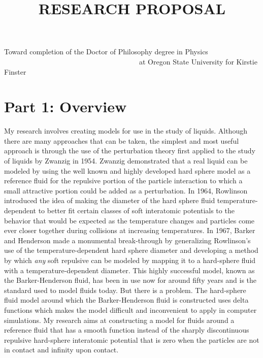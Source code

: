 \documentclass[double,12pt]{revtex4-2}
\begin{document}

\title{RESEARCH PROPOSAL}
\maketitle
\large
\begin{center}Toward completion of the Doctor of Philosophy degree in Physics 
~~~~~~~~~~~~~~~~~~~~~~~~~~~~~~~~~~~~~~at Oregon State University for Kirstie Finster
\end{center}

\normalsize

\section{Part 1: Overview}
My research involves creating models for use in the study of liquids. 
Although there are many approaches that can be taken, the simplest and 
most useful approach is through the use of the perturbation theory first
applied to the study of liquids by Zwanzig in 1954. 
Zwanzig demonstrated that a real liquid can be modeled by using the well 
known and highly developed hard sphere model as a reference fluid for the 
repulsive portion of the particle interaction to which 
a small attractive portion could be added as a perturbation. 
In 1964, Rowlinson introduced the idea of making the diameter of the hard sphere 
fluid temperature-dependent to better fit certain classes of soft interatomic potentials
to the behavior that would be expected as the temperature changes and particles 
come ever closer together during collisions at increasing temperatures.
In 1967, Barker and Henderson made a monumental break-through 
by generalizing 
Rowlinson's use of the temperature-dependent hard sphere diameter and 
developing a method by which \textit{any} soft repulsive can be modeled 
by mapping it to a hard-sphere fluid with a temperature-dependent diameter. %
This highly successful model, known as the 
Barker-Henderson fluid, has been in use now for around fifty years and
is the standard used to model fluids today. %
But there is a problem.
The hard-sphere fluid model around which the Barker-Henderson fluid is 
constructed uses delta functions which makes the model difficult and 
inconvenient to apply in computer simulations. 
My research aims at constructing a model for fluids around a reference 
fluid that has a smooth function instead of the sharply discontinuous 
repulsive hard-sphere interatomic potential that is zero when the 
particles are not in contact and infinity upon contact. 
 
\end{document}
